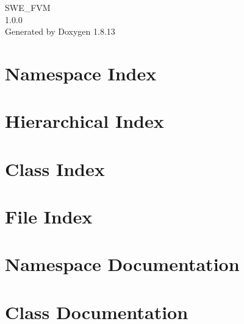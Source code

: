 \documentclass[twoside]{book}
\newcommand{\+}{\discretionary{\mbox{\scriptsize$\hookleftarrow$}}{}{}}
\newcommand{\clearemptydoublepage}{%
  \newpage{\pagestyle{empty}\cleardoublepage}%
}
\begin{document}
\hypersetup{pageanchor=false,
             bookmarksnumbered=true,
             pdfencoding=unicode
            }
\begin{titlepage}
\vspace*{7cm}
\begin{center}%
{\Large S\+W\+E\+\_\+\+F\+VM \\[1ex]\large 1.\+0.\+0 }\\
\vspace*{1cm}
{\large Generated by Doxygen 1.8.13}\\
\end{center}
\end{titlepage}
\clearemptydoublepage
{}
\tableofcontents
\clearemptydoublepage
{}
\hypersetup{pageanchor=true}

\chapter{Namespace Index}

\chapter{Hierarchical Index}

\chapter{Class Index}

\chapter{File Index}

\chapter{Namespace Documentation}





\chapter{Class Documentation}


































\end{document}
